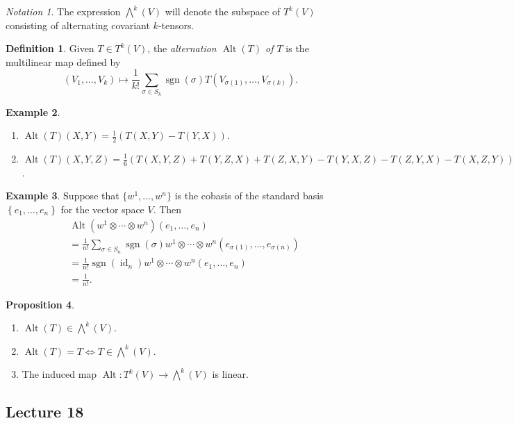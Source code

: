 \documentclass[10pt,letterpaper,cm]{nupset}
\theoremstyle{definition}
\newtheorem{definition}{Definition}[subsection]
\newtheorem{exmp}[definition]{Example}
\theoremstyle{theorem}
\newtheorem{prop}[definition]{Proposition}
\theoremstyle{remark}
\newtheorem*{notation}{Notation}
\newcommand{\1}{\mathbf{1}}
\newcommand{\0}{\vec 0}
\DeclareMathOperator{\id}{id}
\DeclareMathOperator{\Alt}{Alt}
\DeclareMathOperator{\sgn}{sgn}
\begin{document}
\begin{notation}
The  expression $\bigwedge^k(V)$ will denote the subspace of $T^k(V)$ consisting of alternating covariant $k$-tensors. 
\end{notation}

\begin{definition}
Given $T\in T^k(V)$, the \textit{alternation $\Alt(T)$ of $T$} is the multilinear map defined by $$ (V_1, \ldots, V_k) \mapsto \frac{1}{k!} \sum_{\sigma \in S_k} \sgn(\sigma) T\left(V_{\sigma(1)}, \ldots, V_{\sigma(k)}\right).$$
\end{definition}

\begin{exmp}\label{spec} $ $
\begin{enumerate}
\item $\Alt(T)(X,Y) = \frac{1}{2}\left(T(X,Y) - T(Y,X)\right)$.
\item  $\Alt(T)(X, Y, Z) = \frac{1}{6}\left(T(X, Y, Z) + T(Y, Z, X) + T(Z, X, Y)  -T(Y, X, Z)- T(Z, Y, X) -T(X, Z, Y)\right)$.
\end{enumerate}
\end{exmp}

\begin{exmp}\label{fact}
Suppose that $\{w^1, \ldots, w^n\}$ is the cobasis of the standard basis $ \left\{e_1, \ldots, e_n\right\}$ for the vector space $V$. Then
\begin{align*}
& \Alt(w^1 \otimes \cdots \otimes w^n)(e_1, \ldots, e_n)\\ & = \frac{1}{n!} \sum_{\sigma \in S_n} \sgn(\sigma)w^1 \otimes \cdots \otimes w^n\left(e_{\sigma(1)}, \ldots, e_{\sigma(n)}\right) \\ & =  \frac{1}{n!} \sgn\left(\id_n\right) w^1 \otimes \cdots \otimes w^n\left(e_{1}, \ldots, e_{n}\right) 
\\ & = \frac{1}{n!}.
\end{align*}
\end{exmp}

\begin{prop}\label{alt} $ $
\begin{enumerate}
\item $\Alt(T) \in \bigwedge^k(V)$.
\item $\Alt(T) = T \iff T \in \bigwedge^k(V)$.
\item The induced map $\Alt : T^k(V) \to \bigwedge^k(V)$ is linear. 
\end{enumerate}
\end{prop}

\subsection{Lecture 18}
\end{document}
